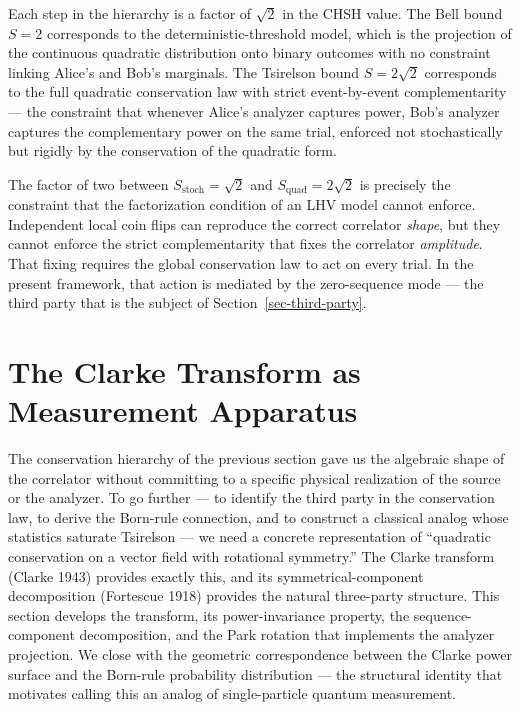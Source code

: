 \documentclass[
  11pt]{article}
\begin{document}
Each step in the hierarchy is a factor of \(\sqrt{2}\) in the CHSH
value. The Bell bound \(S = 2\) corresponds to the
deterministic-threshold model, which is the projection of the continuous
quadratic distribution onto binary outcomes with no constraint linking
Alice's and Bob's marginals. The Tsirelson bound \(S = 2\sqrt{2}\)
corresponds to the full quadratic conservation law with strict
event-by-event complementarity --- the constraint that whenever Alice's
analyzer captures power, Bob's analyzer captures the complementary power
on the same trial, enforced not stochastically but rigidly by the
conservation of the quadratic form.

The factor of two between \(S_\text{stoch} = \sqrt{2}\) and
\(S_\text{quad} = 2\sqrt{2}\) is precisely the constraint that the
factorization condition of an LHV model cannot enforce. Independent
local coin flips can reproduce the correct correlator \emph{shape}, but
they cannot enforce the strict complementarity that fixes the correlator
\emph{amplitude}. That fixing requires the global conservation law to
act on every trial. In the present framework, that action is mediated by
the zero-sequence mode --- the third party that is the subject of
Section~\ref{sec-third-party}.

\newpage

\section{The Clarke Transform as Measurement
Apparatus}\label{sec-clarke}

The conservation hierarchy of the previous section gave us the algebraic
shape of the correlator without committing to a specific physical
realization of the source or the analyzer. To go further --- to identify
the third party in the conservation law, to derive the Born-rule
connection, and to construct a classical analog whose statistics
saturate Tsirelson --- we need a concrete representation of ``quadratic
conservation on a vector field with rotational symmetry.'' The Clarke
transform (Clarke 1943) provides exactly this, and its
symmetrical-component decomposition (Fortescue 1918) provides the
natural three-party structure. This section develops the transform, its
power-invariance property, the sequence-component decomposition, and the
Park rotation that implements the analyzer projection. We close with the
geometric correspondence between the Clarke power surface and the
Born-rule probability distribution --- the structural identity that
motivates calling this an analog of single-particle quantum measurement.
\end{document}
